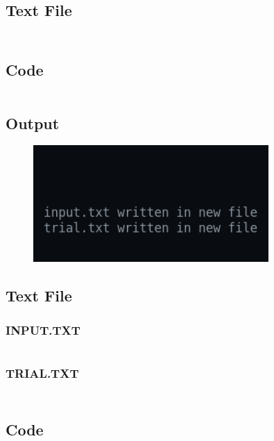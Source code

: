 \documentclass[12pt]{article}
\begin{document}
\subsection{Text File}
\inputminted{c}{TRIAL.TXT}

\newpage
\section{}
\subsection{Code}
\inputminted{c}{q6.c}
\newpage
\subsection{Output}
\begin{figure}[h]
    \centering
    \includegraphics[width=0.8\textwidth]{6.png}
\end{figure}
\subsection{Text File}
\subsubsection{INPUT.TXT}
\inputminted{c}{INPUT.TXT}
\subsubsection{TRIAL.TXT}
\inputminted{c}{TRIAL.TXT}

\newpage
\section{}
\subsection{Code}
\inputminted{c}{q7.c}
\newpage
\end{document}
